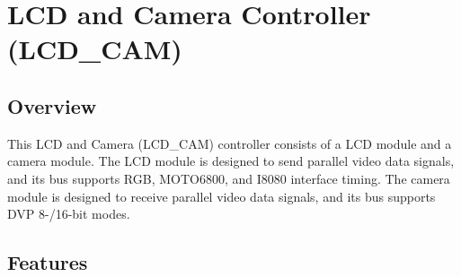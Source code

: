 \documentclass[main\_\_EN.tex]{subfiles}
\begin{document}

\ifglobal
\else
    {\let\clearpage\relax \listoftodos}
    \tableofcontents
\fi



\hypertarget{camlcdctrl}{}
\chapter{LCD and Camera Controller (LCD\_CAM)}
\label{mod:camlcdctrl}



\section{Overview}

This LCD and Camera (LCD\_CAM) controller consists of a LCD module and a camera module. The LCD module is designed to send parallel video data signals, and its bus supports RGB, MOTO6800, and I8080 interface timing. The camera module is designed to receive parallel video data signals, and its bus supports DVP 8-/16-bit modes.

\section{Features}
\end{document}
